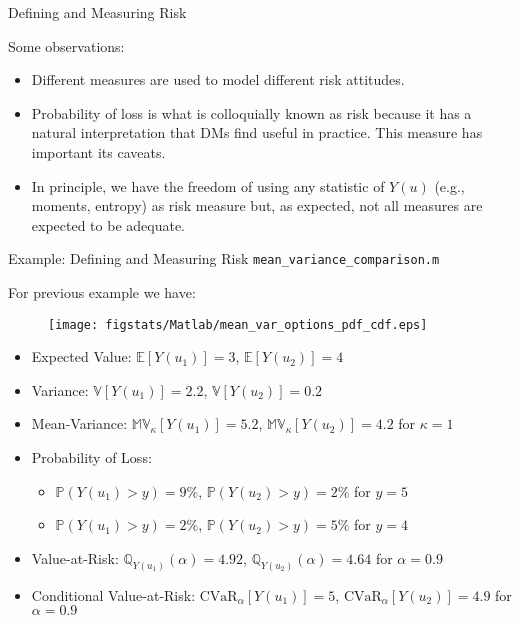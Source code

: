 \documentclass[9pt]{beamer}
\begin{document}
%
\begin{frame}{Defining and Measuring Risk}

Some observations:
\begin{itemize}
   \setlength{\itemsep}{10pt}
\item Different measures are used to model different risk attitudes. 

\item Probability of loss is what is colloquially known as risk because it has a natural interpretation that DMs find useful in practice. This measure has important its caveats. 

\item In principle, we have the freedom of using any statistic of $Y(u)$ (e.g., moments, entropy) as risk measure but, as expected, not all measures are expected to be adequate.   
\end{itemize}

\end{frame}

%
\begin{frame}{Example: Defining and Measuring Risk \footnotesize{\texttt{mean\_variance\_comparison.m}}}

For previous example we have:
\begin{figure}[!htb]
    \centering
	\texttt{[image: figstats/Matlab/mean\_var\_options\_pdf\_cdf.eps]}
\end{figure}
\vspace{-0.1in}
\begin{itemize}
   \setlength{\itemsep}{10pt}
\item Expected Value: $\mathbb{E}[Y(u_1)]=3$, $\mathbb{E}[Y(u_2)]=4$
\item Variance: $\mathbb{V}[Y(u_1)]=2.2$, $\mathbb{V}[Y(u_2)]=0.2$
\item Mean-Variance: $\mathbb{MV}_\kappa[Y(u_1)]=5.2$, $\mathbb{MV}_\kappa[Y(u_2)]=4.2$ for $\kappa=1$
\item Probability of Loss: 
\begin{itemize}
\item $\mathbb{P}(Y(u_1)>y)=9\%$, $\mathbb{P}(Y(u_2)> y)=2\%$  for $y=5$
\item $\mathbb{P}(Y(u_1)>y)=2\%$, $\mathbb{P}(Y(u_2)> y)=5\%$  for $y=4$
\end{itemize}
\item Value-at-Risk: $\mathbb{Q}_{Y(u_1)}(\alpha)=4.92$, $\mathbb{Q}_{Y(u_2)}(\alpha)=4.64$ for $\alpha=0.9$
\item Conditional Value-at-Risk: $\textrm{CVaR}_\alpha[Y(u_1)]=5$, $\textrm{CVaR}_\alpha[Y(u_2)]=4.9$  for $\alpha=0.9$
\end{itemize}

\end{frame}
\end{document}
